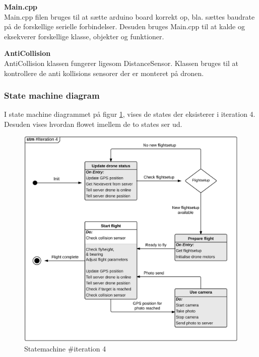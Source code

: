 \textbf{Main.cpp} \\
Main.cpp filen bruges til at sætte arduino board korrekt op, bla. sættes baudrate på de forskellige serielle forbindelser. Desuden bruges Main.cpp til at kalde og eksekverer forskellige klasse, objekter og funktioner.


\textbf{AntiCollision} \\
AntiCollision klassen fungerer ligesom DistanceSensor. Klassen bruges til at kontrollere de anti kollisions sensorer der er monteret på dronen. 

\newpage

\subsubsection*{State machine diagram}
\vspace{-0.2cm}

I state machine diagrammet på figur \ref{fig:Statemachine_iteration4}, vises de states der eksisterer i iteration 4. Desuden vises hvordan flowet imellem de to states ser ud.


\begin{figure}[H]
	\centering
	\includegraphics[width=1\textwidth]{Billeder/statemachine/State_iteration4.png}
	\vspace{-0.5cm}
	\caption{Statemachine \#iteration 4}
	\label{fig:Statemachine_iteration4}
\end{figure}